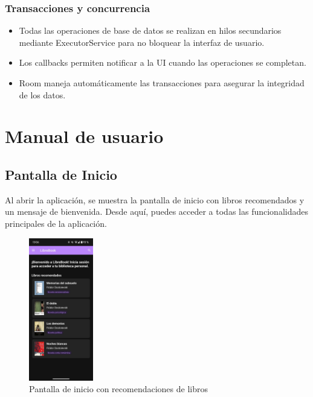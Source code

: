 \documentclass[a4paper,10pt]{report}
\begin{document}
      \subsection{Transacciones y concurrencia}
        \begin{itemize}
          \item Todas las operaciones de base de datos se realizan en hilos secundarios mediante ExecutorService para no bloquear la interfaz de usuario\cite{android_best_practices}.
          \item Los callbacks permiten notificar a la UI cuando las operaciones se completan.
          \item Room maneja automáticamente las transacciones para asegurar la integridad de los datos.
        \end{itemize}
  \chapter{Manual de usuario}
    \setlength{\intextsep}{10pt}        %
    \setlength{\abovecaptionskip}{5pt}  %
    \setlength{\belowcaptionskip}{10pt}  %
    \setlength{\parskip}{8pt}           %
  
    \section{Pantalla de Inicio}
      Al abrir la aplicación, se muestra la pantalla de inicio con libros recomendados y un mensaje de bienvenida. Desde aquí, puedes acceder a todas las funcionalidades principales de la aplicación.
      
      \begin{figure}[H]
        \centering
        \includegraphics[width=0.25\textwidth]{.img/inicio.png}
        \caption{Pantalla de inicio con recomendaciones de libros}
        \label{fig:inicio}
      \end{figure}
      
\end{document}
